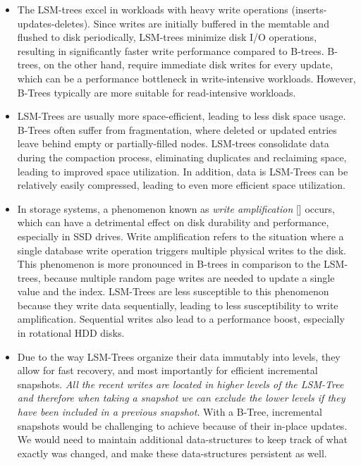 \begin{itemize}
    \item The LSM-trees excel in workloads with heavy write operations (inserts-updates-deletes). Since writes are initially buffered in the memtable and flushed to disk periodically, LSM-trees minimize disk I/O operations, resulting in significantly faster write performance compared to B-trees. B-trees, on the other hand, require immediate disk writes for every update, which can be a performance bottleneck in write-intensive workloads. However, B-Trees typically are more suitable for read-intensive workloads.

    \item LSM-Trees are usually more space-efficient, leading to less disk space usage. B-Trees often suffer from fragmentation, where deleted or updated entries leave behind empty or partially-filled nodes. LSM-trees consolidate data during the compaction process, eliminating duplicates and reclaiming space, leading to improved space utilization. In addition, data is LSM-Trees can be relatively easily compressed, leading to even more efficient space utilization.

    \item In storage systems, a phenomenon known as \textit{write amplification} [\cite{write-amplification,space-amplification}] occurs, which can have a detrimental effect on disk durability and performance, especially in SSD drives. Write amplification refers to the situation where a single database write operation triggers multiple physical writes to the disk. This phenomenon is more pronounced in B-trees in comparison to the LSM-trees, because multiple random page writes are needed to update a single value and the index. LSM-Trees are less susceptible to this phenomenon because they write data sequentially, leading to less susceptibility to write amplification. Sequential writes also lead to a performance boost, especially in rotational HDD disks.

    \item Due to the way LSM-Trees organize their data immutably into levels, they allow for fast recovery, and most importantly for efficient incremental snapshots. \textit{All the recent writes are located in higher levels of the LSM-Tree and therefore when taking a snapshot we can exclude the lower levels if they have been included in a previous snapshot}. With a B-Tree, incremental snapshots would be challenging to achieve because of their in-place updates. We would need to maintain additional data-structures to keep track of what exactly was changed, and make these data-structures persistent as well.
\end{itemize}

